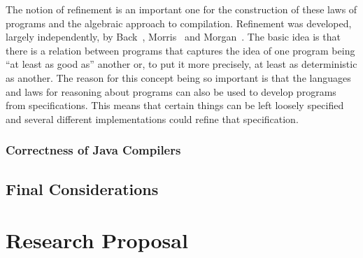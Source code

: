 \documentclass[a4paper,10pt]{report}
\begin{document}
The notion of refinement is an important one for the construction of these laws
of programs and the algebraic approach to compilation.  Refinement was
developed, largely independently, by Back~\cite{back1981},
Morris~\cite{morris1987} and Morgan~\cite{morgan1990}.  The basic idea is that
there is a relation between programs that captures the idea of one program being
``at least as good as'' another or, to put it more precisely, at least as
deterministic as another.  The reason for this concept being so important is
that the languages and laws for reasoning about programs can also be used to
develop programs from specifications.  This means that certain things can be
left loosely specified and several different implementations could refine that
specification. %


\subsection{Correctness of Java Compilers}
\label{java-compiler-correctness-subsection}


\section{\Circus{}}
\label{circus-section}


\section{Final Considerations}
\label{final-considerations-section}


\chapter{Research Proposal}
\label{research-proposal-chapter}

\end{document}
